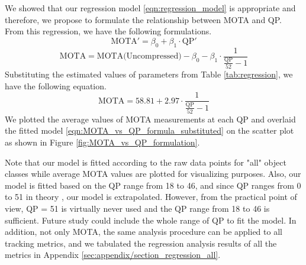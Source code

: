 We showed that our regression model \eqref{eqn:regression_model} is appropriate and therefore, we propose to formulate the relationship between MOTA and QP. From this regression, we have the following formulations.
\begin{equation}
    \text{MOTA}' = \beta_0 + \beta_1 \cdot \text{QP}'
\end{equation}
\begin{equation}
    \text{MOTA} = \text{MOTA(Uncompressed)} - \beta_0 - \beta_1 \cdot \frac{1}{ \frac{\text{QP}}{52} - 1 }
\label{eqn:MOTA_vs_QP_formula}
\end{equation}
Substituting the estimated values of parameters from Table \ref{tab:regression}, we have the following equation.
\begin{equation}
    \text{MOTA} = 58.81 + 2.97 \cdot \frac{1}{ \frac{\text{QP}}{52} - 1 }
\label{eqn:MOTA_vs_QP_formula_substituted}
\end{equation}
We plotted the average values of MOTA measurements at each QP and overlaid the fitted model \ref{eqn:MOTA_vs_QP_formula_substituted} on the scatter plot as shown in Figure \ref{fig:MOTA_vs_QP_formulation}.

Note that our model is fitted according to the raw data points for "all" object classes while average MOTA values are plotted for visualizing purposes. Also, our model is fitted based on the QP range from 18 to 46, and since QP ranges from 0 to 51 in theory \cite{sullivan_overview_2012}, our model is extrapolated. However, from the practical point of view, QP = 51 is virtually never used and the QP range from 18 to 46 is sufficient. Future study could include the whole range of QP to fit the model. In addition, not only MOTA, the same analysis procedure can be applied to all tracking metrics, and we tabulated the regression analysis results of all the metrics in Appendix \ref{sec:appendix/section_regression_all}.


